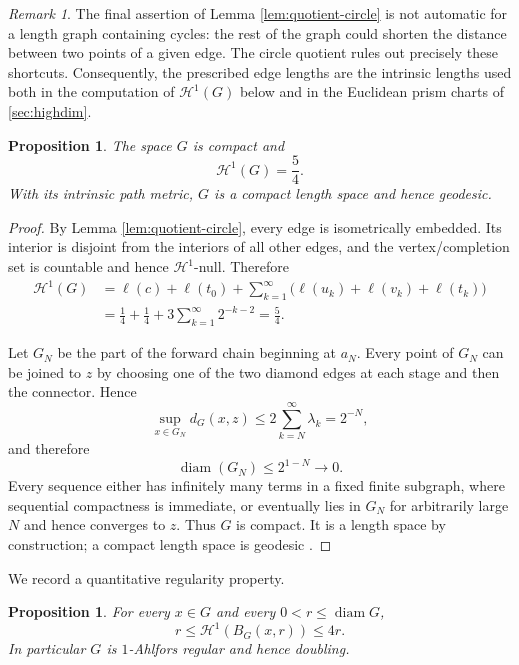 \documentclass[11pt]{article}
\newtheorem{proposition}[theorem]{Proposition}
\theoremstyle{remark}
\newtheorem{remark}[theorem]{Remark}
\newcommand{\Hh}{\mathcal H}
\newcommand{\diam}{\operatorname{diam}}
\begin{document}
\begin{remark}\label{rem:no-shortcuts}
The final assertion of Lemma \ref{lem:quotient-circle} is not automatic for a length graph containing cycles: the rest of the graph could shorten the distance between two points of a given edge. The circle quotient rules out precisely these shortcuts. Consequently, the prescribed edge lengths are the intrinsic lengths used both in the computation of \(\Hh^1(G)\) below and in the Euclidean prism charts of \cref{sec:highdim}.
\end{remark}

\begin{proposition}\label{prop:compact-length}
The space $G$ is compact and
\[
      \Hh^1(G)=\frac54.
\]
With its intrinsic path metric, $G$ is a compact length space and hence geodesic.
\end{proposition}

\begin{proof}
By Lemma \ref{lem:quotient-circle}, every edge is isometrically embedded. Its interior is disjoint from the interiors of all other edges, and the vertex/completion set is countable and hence $\Hh^1$-null. Therefore
\[
\begin{aligned}
 \Hh^1(G)
 &=\ell(c)+\ell(t_0)+\sum_{k=1}^\infty
 \bigl(\ell(u_k)+\ell(v_k)+\ell(t_k)\bigr)\\
 &=\frac14+\frac14+3\sum_{k=1}^\infty2^{-k-2}
 =\frac54.
\end{aligned}
\]

Let $G_N$ be the part of the forward chain beginning at $a_N$. Every point of $G_N$ can be joined to $z$ by choosing one of the two diamond edges at each stage and then the connector. Hence
\[
   \sup_{x\in G_N}d_G(x,z)
   \le 2\sum_{k=N}^\infty\lambda_k
   =2^{-N},
\]
and therefore
\[
   \diam(G_N)\le 2^{1-N}\longrightarrow0.
\]
Every sequence either has infinitely many terms in a fixed finite subgraph, where sequential compactness is immediate, or eventually lies in $G_N$ for arbitrarily large $N$ and hence converges to $z$. Thus $G$ is compact. It is a length space by construction; a compact length space is geodesic \cite[Chapter 2]{BBI01}.
\end{proof}

We record a quantitative regularity property.

\begin{proposition}\label{prop:ahlfors}
For every $x\in G$ and every $0<r\le\diam G$,
\[
      r\le \Hh^1(B_G(x,r))\le 4r.
\]
In particular $G$ is $1$-Ahlfors regular and hence doubling.
\end{proposition}
\end{document}
